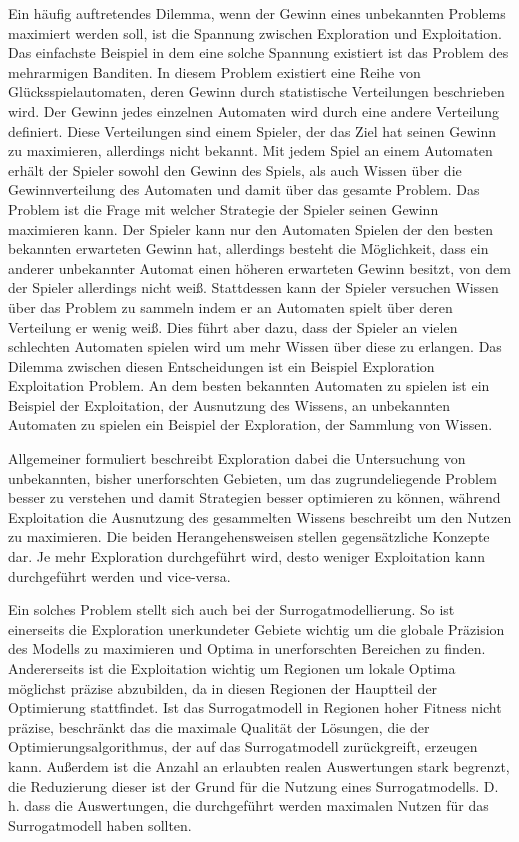 Ein häufig auftretendes Dilemma, wenn der Gewinn eines unbekannten Problems maximiert werden soll, ist die Spannung zwischen Exploration und Exploitation.
Das einfachste Beispiel in dem eine solche Spannung existiert ist das Problem des mehrarmigen Banditen.
In diesem Problem existiert eine Reihe von Glücksspielautomaten, deren Gewinn durch statistische Verteilungen beschrieben wird.
Der Gewinn jedes einzelnen Automaten wird durch eine andere Verteilung definiert.
Diese Verteilungen sind einem Spieler, der das Ziel hat seinen Gewinn zu maximieren, allerdings nicht bekannt.
Mit jedem Spiel an einem Automaten erhält der Spieler sowohl den Gewinn des Spiels, als auch Wissen über die Gewinnverteilung des Automaten und damit über das gesamte Problem.
Das Problem ist die Frage mit welcher Strategie der Spieler seinen Gewinn maximieren kann.
Der Spieler kann nur den Automaten Spielen der den besten bekannten erwarteten Gewinn hat, allerdings besteht die Möglichkeit, dass ein anderer unbekannter Automat einen höheren erwarteten Gewinn besitzt, von dem der Spieler allerdings nicht weiß.
Stattdessen kann der Spieler versuchen Wissen über das Problem zu sammeln indem er an Automaten spielt über deren Verteilung er wenig weiß. 
Dies führt aber dazu, dass der Spieler an vielen schlechten Automaten spielen wird um mehr Wissen über diese zu erlangen.
Das Dilemma zwischen diesen Entscheidungen ist ein Beispiel Exploration Exploitation Problem.
An dem besten bekannten Automaten zu spielen ist ein Beispiel der Exploitation, der Ausnutzung des Wissens, an unbekannten Automaten zu spielen ein Beispiel der Exploration, der Sammlung von Wissen.

Allgemeiner formuliert beschreibt Exploration dabei die Untersuchung von unbekannten, bisher unerforschten Gebieten, um das zugrundeliegende Problem besser zu verstehen und damit Strategien besser optimieren zu können, während Exploitation die Ausnutzung des gesammelten Wissens beschreibt um den Nutzen zu maximieren.
Die beiden Herangehensweisen stellen gegensätzliche Konzepte dar.
Je mehr Exploration durchgeführt wird, desto weniger Exploitation kann durchgeführt werden und vice-versa.

Ein solches Problem stellt sich auch bei der Surrogatmodellierung.
So ist einerseits die Exploration unerkundeter Gebiete wichtig um die globale Präzision des Modells zu maximieren und Optima in unerforschten Bereichen zu finden.
Andererseits ist die Exploitation wichtig um Regionen um lokale Optima möglichst präzise abzubilden, da in diesen Regionen der Hauptteil der Optimierung stattfindet.
Ist das Surrogatmodell in Regionen hoher Fitness nicht präzise, beschränkt das die maximale Qualität der Lösungen, die der Optimierungsalgorithmus, der auf das Surrogatmodell zurückgreift, erzeugen kann.
Außerdem ist die Anzahl an erlaubten realen Auswertungen stark begrenzt, die Reduzierung dieser ist der Grund für die Nutzung eines Surrogatmodells.
D. h. dass die Auswertungen, die durchgeführt werden maximalen Nutzen für das Surrogatmodell haben sollten.

